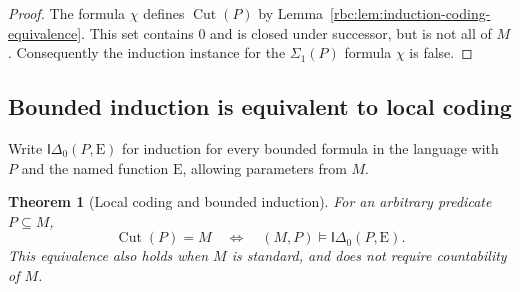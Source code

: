 \documentclass[11pt]{article}
\numberwithin{equation}{section}
\newtheorem{theorem}{Theorem}[section]
\theoremstyle{definition}
\theoremstyle{remark}
\newcommand{\E}{\mathrm E}
\newcommand{\Cut}{\operatorname{Cut}}
\begin{document}
\begin{proof}
The formula $\chi$ defines $\Cut(P)$ by
Lemma~\ref{rbc:lem:induction-coding-equivalence}.  This set contains $0$
and is closed under successor, but is not all of $M$.  Consequently
the induction instance for the $\Sigma_1(P)$ formula $\chi$ is false.
\end{proof}

\subsection{Bounded induction is equivalent to local coding}

Write $\mathsf{I}\Delta_0(P,\E)$ for induction for every bounded
formula in the language with $P$ and the named function $\E$, allowing
parameters from $M$.

\begin{theorem}[Local coding and bounded induction]
\label{rbc:thm:induction-local-equivalence}
For an arbitrary predicate $P\subseteq M$,
\begin{equation}
 \Cut(P)=M
 \quad\Longleftrightarrow\quad
 (M,P)\models\mathsf{I}\Delta_0(P,\E).
 \label{rbc:eq:induction-local-equivalence}
\end{equation}
This equivalence also holds when $M$ is standard, and does not require
countability of $M$.
\end{theorem}
\end{document}
